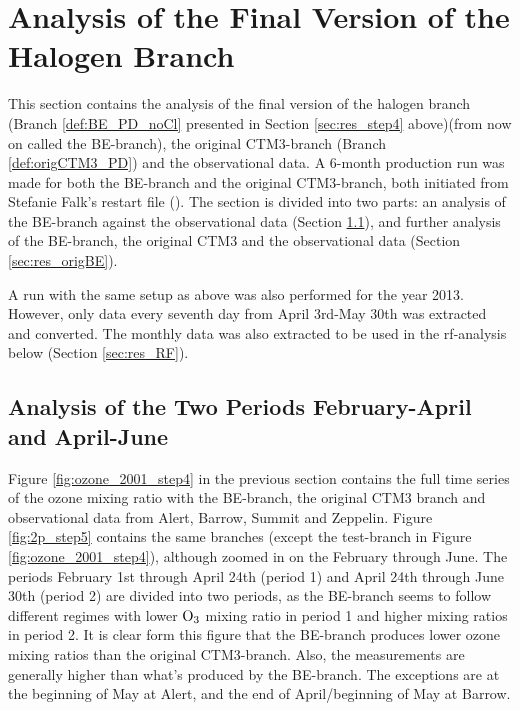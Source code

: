 

\clearpage

\section{Analysis of the Final Version of the Halogen Branch}\label{sec:res_final_Version}

This section contains the analysis of the final version of the halogen branch (Branch \ref{def:BE_PD_noCl} presented in Section \ref{sec:res_step4} above)(from now on called the BE-branch), the original CTM3-branch (Branch \ref{def:origCTM3_PD}) and the observational data. A 6-month production run was made for both the BE-branch and the original CTM3-branch, both initiated from Stefanie Falk's restart file (\cite{StefaniePersonal}). The section is divided into two parts: an analysis of the BE-branch against the observational data (Section \ref{sec:res_twoPeriods}), and further analysis of the BE-branch, the original CTM3 and the observational data (Section \ref{sec:res_origBE}).

\medskip

A run with the same setup as above was also performed for the year 2013. However, only data every seventh day from April 3rd-May 30th was extracted and converted. The monthly data was also extracted to be used in the \acrlong{rf}-analysis below (Section \ref{sec:res_RF}). 

\subsection{Analysis of the Two Periods February-April and April-June}\label{sec:res_twoPeriods}

Figure \ref{fig:ozone_2001_step4} in the previous section contains the full time series of the ozone mixing ratio with the BE-branch, the original CTM3 branch and observational data from Alert, Barrow, Summit and Zeppelin. Figure \ref{fig:2p_step5} contains the same branches (except the test-branch in Figure \ref{fig:ozone_2001_step4}), although zoomed in on the February through June. The periods February 1st through April 24th (period 1) and April 24th through June 30th (period 2) are divided into two periods, as the BE-branch seems to follow different regimes with lower $\mathrm{O_3}$ mixing ratio in period 1 and higher mixing ratios in period 2. It is clear form this figure that the BE-branch produces lower ozone mixing ratios than the original CTM3-branch. Also, the measurements are generally higher than what's produced by the BE-branch. The exceptions are at the beginning of May at Alert,  and the end of April/beginning of May at Barrow.

